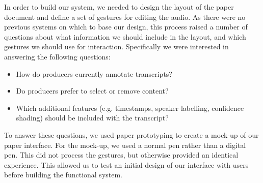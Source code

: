 In order to build our system, we needed to design the layout of the paper document and define a set of gestures for
editing the audio.  As there were no previous systems on which to base our design, this process raised a number of
questions about what information we should include in the layout, and which gestures we should use for interaction.
Specifically we were interested in answering the following questions:

  \begin{itemize}
    \item How do producers currently annotate transcripts?
    \item Do producers prefer to select or remove content?
    \item Which additional features (e.g.  timestamps, speaker labelling, confidence shading) should be included with
          the transcript?
  \end{itemize}

To answer these questions, we used paper prototyping to create a mock-up of our paper interface. For the mock-up, we
used a normal pen rather than a digital pen. This did not process the gestures, but otherwise provided an identical
experience.  This allowed us to test an initial design of our interface with users before building the functional
system.




